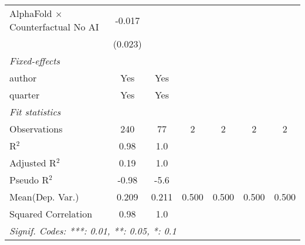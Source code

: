 \begin{tabular}{lcccccc}
   AlphaFold $\times$ Counterfactual No AI  & -0.017        &                &     &     &     &   \\   
                                            & (0.023)       &                &     &     &     &   \\   
   \midrule
   \emph{Fixed-effects}\\
   author                                   & Yes           & Yes            &     &     &     & \\  
   quarter                                  & Yes           & Yes            &     &     &     & \\  
   \midrule
   \emph{Fit statistics}\\
   Observations                             & 240           & 77             & 2   & 2   & 2   & 2\\  
   R$^2$                                    & 0.98          & 1.0            &     &     &     & \\  
   Adjusted R$^2$                           & 0.19          & 1.0            &     &     &     & \\  
   Pseudo R$^2$                             & -0.98         & -5.6           &     &     &     & \\  
Mean(Dep. Var.) & 0.209 & 0.211 & 0.500 & 0.500 & 0.500 & 0.500 \\
   Squared Correlation                      & 0.98          & 1.0            &     &     &     & \\  
   \midrule \midrule
   \multicolumn{7}{l}{\emph{Signif. Codes: ***: 0.01, **: 0.05, *: 0.1}}\\
\end{tabular}
\par\endgroup
